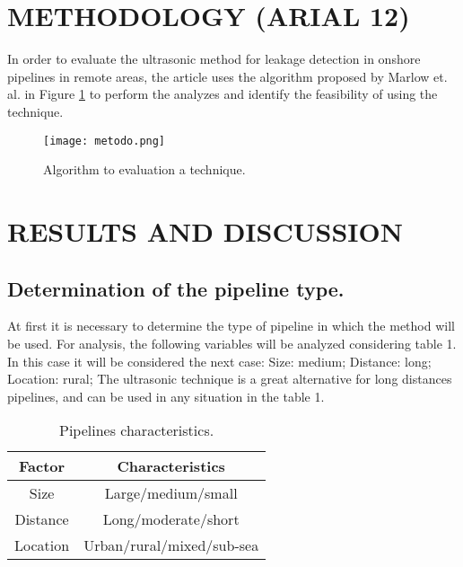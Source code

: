 \documentclass[
	article,			%
	12pt,				%
	oneside,			%
	a4paper,			%
	english,			%
	brazil,				%
	sumario=tradicional
	]{abntex2}
\begin{document}
\section{\textbf{METHODOLOGY (ARIAL 12)}}

In order to evaluate the ultrasonic method for leakage detection in onshore pipelines in remote areas, the article uses the algorithm proposed by Marlow et. al. in Figure \ref{fig:figura-organograma} to perform the analyzes and identify the feasibility of using the technique\cite{marlow}.



\begin{figure} [h!]	
   \label{fig:figura-organograma}											 
	\centering		
	\caption{Algorithm to evaluation a technique.}
	\texttt{[image: metodo.png]}
\end{figure}



\section{\textbf{RESULTS AND DISCUSSION}}

\subsection{\textbf{Determination of the pipeline type.}}
At first it is necessary to determine the type of pipeline in which the method will be used. For analysis, the following variables will be analyzed considering table 1\cite{lu}. In this case it will be considered the next case: Size: medium; Distance: long; Location: rural; %
The ultrasonic technique is a great alternative for long distances pipelines, and can be used in any situation in the table 1\cite{lu}\cite{wang}. 

\begin{table}[h!]
\label{tab:pipes}
\centering		
\caption{Pipelines characteristics\cite{lu}.}
\begin{tabular}{|c|c|}
\hline
Factor & Characteristics  \\ \hline
Size & Large/medium/small  \\ \hline
Distance & Long/moderate/short  \\ \hline
Location & Urban/rural/mixed/sub-sea  \\ \hline
\end{tabular}
\end{table}
\end{document}

